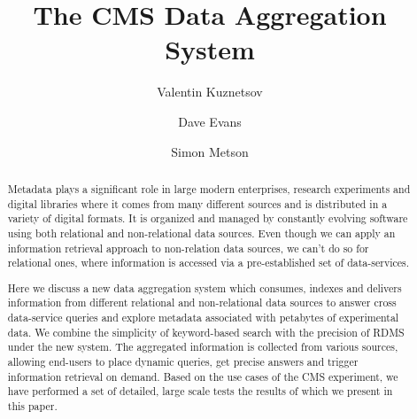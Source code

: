\documentclass[1p,times]{elsarticle}
\begin{document}
\begin{frontmatter}



\dochead{}

\title{The CMS Data Aggregation System}


\author[vkuznet]{Valentin Kuznetsov}
\address[vkuznet]{Cornell University, Ithaca, New York, USA}

\author[evans]{Dave Evans}
\address[evans]{Fermilab, Batavia, Illinois, USA}

\author[metson]{Simon Metson}
\address[metson]{Bristol University, Bristol, UK}


\begin{abstract}
Metadata plays a significant role in large modern enterprises, 
research experiments and digital libraries where it comes from many different 
sources and is distributed in a variety of digital formats. 
It is organized and managed by constantly evolving software using 
both relational and non-relational data sources. Even though we can apply
an information retrieval approach to non-relation data sources,
we can't do so for relational ones, where information is accessed via
a pre-established set of data-services.

Here we discuss a new data aggregation system which consumes, 
indexes and delivers information from different relational and 
non-relational data sources to answer cross data-service queries 
and explore metadata associated with petabytes of experimental data. 
We combine the simplicity of keyword-based search with the precision of RDMS
under the new system. The aggregated information is collected from various sources,
allowing end-users to place dynamic queries, get precise answers and 
trigger information retrieval on demand. Based on the use cases of the CMS experiment, 
we have performed a set of detailed, large scale tests the results of which 
we present in this paper.
\end{abstract}


\end{frontmatter}
\end{document}
